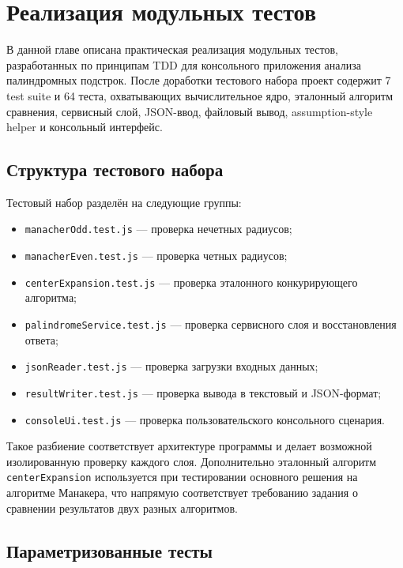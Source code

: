 \chapter{Реализация модульных тестов} \label{ch4}

В данной главе описана практическая реализация модульных тестов, разработанных по принципам TDD для консольного приложения анализа палиндромных подстрок.
После доработки тестового набора проект содержит 7 test suite и 64 теста, охватывающих вычислительное ядро, эталонный алгоритм сравнения, сервисный слой, JSON-ввод, файловый вывод, assumption-style helper и консольный интерфейс.

\section{Структура тестового набора} \label{ch4:sec1}

Тестовый набор разделён на следующие группы:
\begin{itemize}
    \item \texttt{manacherOdd.test.js} --- проверка нечетных радиусов;
    \item \texttt{manacherEven.test.js} --- проверка четных радиусов;
    \item \texttt{centerExpansion.test.js} --- проверка эталонного конкурирующего алгоритма;
    \item \texttt{palindromeService.test.js} --- проверка сервисного слоя и восстановления ответа;
    \item \texttt{jsonReader.test.js} --- проверка загрузки входных данных;
    \item \texttt{resultWriter.test.js} --- проверка вывода в текстовый и JSON-формат;
    \item \texttt{consoleUi.test.js} --- проверка пользовательского консольного сценария.
\end{itemize}

Такое разбиение соответствует архитектуре программы и делает возможной изолированную проверку каждого слоя.
Дополнительно эталонный алгоритм \texttt{centerExpansion} используется при тестировании основного решения на алгоритме Манакера, что напрямую соответствует требованию задания о сравнении результатов двух разных алгоритмов.

\section{Параметризованные тесты} \label{ch4:sec2}

